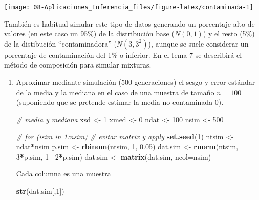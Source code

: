 \documentclass[]{book}
\newenvironment{Shaded}{\begin{snugshade}}{\end{snugshade}}
\newcommand{\KeywordTok}[1]{\textcolor[rgb]{0.13,0.29,0.53}{\textbf{#1}}}
\newcommand{\DataTypeTok}[1]{\textcolor[rgb]{0.13,0.29,0.53}{#1}}
\newcommand{\DecValTok}[1]{\textcolor[rgb]{0.00,0.00,0.81}{#1}}
\newcommand{\FloatTok}[1]{\textcolor[rgb]{0.00,0.00,0.81}{#1}}
\newcommand{\StringTok}[1]{\textcolor[rgb]{0.31,0.60,0.02}{#1}}
\newcommand{\CommentTok}[1]{\textcolor[rgb]{0.56,0.35,0.01}{\textit{#1}}}
\newcommand{\OperatorTok}[1]{\textcolor[rgb]{0.81,0.36,0.00}{\textbf{#1}}}
\newcommand{\NormalTok}[1]{#1}
\theoremstyle{definition}
\theoremstyle{definition}
\theoremstyle{definition}
\theoremstyle{remark}
\let\BeginKnitrBlock\begin \let\EndKnitrBlock\end
\begin{document}
\begin{center}\texttt{[image: 08-Aplicaciones\_Inferencia\_files/figure-latex/contaminada-1]} \end{center}

\BeginKnitrBlock{remark}
{}También es habitual simular este tipo de datos
generando un porcentaje alto de valores (en este caso un 95\%) de la
distribución base (\(N(0,1)\)) y el resto (5\%) de la distibución
``contaminadora'' (\(N(3,3^2)\)), aunque se suele considerar un
porcentaje de contaminación del 1\% o inferior. En el tema 7 se
describirá el método de composición para simular mixturas.
\EndKnitrBlock{remark}

 \vspace{0.5cm}

\begin{enumerate}
\def\labelenumi{\alph{enumi})}
\item
  Aproximar mediante simulación (500 generaciones) el sesgo y error
  estándar de la media y la mediana en el caso de una muestra de tamaño
  \(n=100\) (suponiendo que se pretende estimar la media no contaminada
  0).

\begin{Shaded}
\begin{Highlighting}[]
\CommentTok{# media y mediana}
\NormalTok{xsd <-}\StringTok{ }\DecValTok{1}
\NormalTok{xmed <-}\StringTok{ }\DecValTok{0}
\NormalTok{ndat <-}\StringTok{ }\DecValTok{100}
\NormalTok{nsim <-}\StringTok{ }\DecValTok{500}

\CommentTok{# for (isim in 1:nsim) # evitar matrix y apply}
\KeywordTok{set.seed}\NormalTok{(}\DecValTok{1}\NormalTok{)}
\NormalTok{ntsim <-}\StringTok{ }\NormalTok{ndat}\OperatorTok{*}\NormalTok{nsim}
\NormalTok{p.sim <-}\StringTok{ }\KeywordTok{rbinom}\NormalTok{(ntsim, }\DecValTok{1}\NormalTok{, }\FloatTok{0.05}\NormalTok{)}
\NormalTok{dat.sim <-}\StringTok{ }\KeywordTok{rnorm}\NormalTok{(ntsim, }\DecValTok{3}\OperatorTok{*}\NormalTok{p.sim, }\DecValTok{1}\OperatorTok{+}\DecValTok{2}\OperatorTok{*}\NormalTok{p.sim)}
\NormalTok{dat.sim <-}\StringTok{ }\KeywordTok{matrix}\NormalTok{(dat.sim, }\DataTypeTok{ncol=}\NormalTok{nsim)}
\end{Highlighting}
\end{Shaded}

  Cada columna es una muestra

\begin{Shaded}
\begin{Highlighting}[]
\KeywordTok{str}\NormalTok{(dat.sim[,}\DecValTok{1}\NormalTok{])}
\end{Highlighting}
\end{Shaded}


\end{enumerate}
\end{document}
